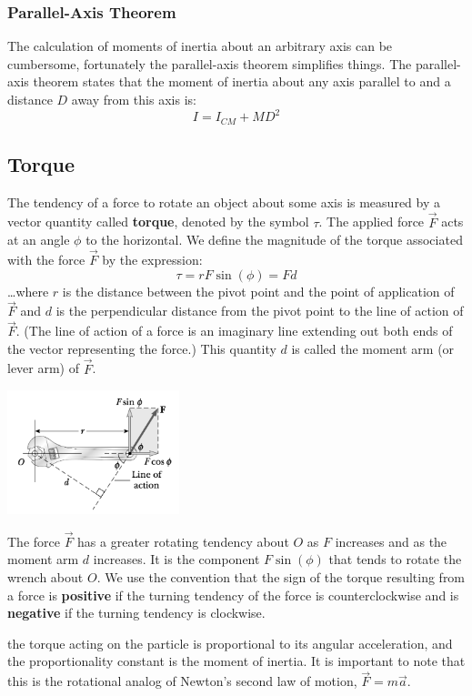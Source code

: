 \documentclass{article}
\begin{document}
\subsubsection{Parallel-Axis Theorem}
The calculation of moments of inertia about an arbitrary axis can be cumbersome, fortunately the parallel-axis theorem simplifies things. The parallel-axis theorem states that the moment of inertia about any axis parallel to and a distance $D$ away from this axis is:
\[
I=I_{CM}+MD^2
\]
\subsection{Torque}
The tendency of a force to rotate an object about some axis is measured by a vector quantity called \textbf{torque}, denoted by the symbol $\tau$. The applied force $\vec{F}$ acts at an angle $\phi$ to the horizontal. We define the magnitude of the torque associated with the force $\vec{F}$ by the expression:
\[
\tau=rF\sin(\phi)=Fd
\]
\ldots where $r$ is the distance between the pivot point and the point of application of $\vec{F}$ and $d$ is the perpendicular distance from the pivot point to the line of action of $\vec{F}$. (The line of action of a force is an imaginary line extending out both ends of the vector representing the force.) This quantity $d$ is called the moment arm (or lever arm) of $\vec{F}$.
\begin{multicols}{2}
  \centerline{\includegraphics[width=5cm]{wrench.png}}
  \columnbreak
  The force $\vec{F}$ has a greater rotating tendency about $O$ as $F$ increases and as the moment arm $d$ increases. It is the component $F\sin(\phi)$ that tends to rotate the wrench about $O$. We use the convention that the sign of the torque resulting from a force is \textbf{positive} if the turning tendency of the force is counterclockwise and is \textbf{negative} if the turning tendency is clockwise.
\end{multicols}
the torque acting on the particle is proportional to its angular acceleration, and the proportionality constant is the moment of inertia. It is important to note that this is the rotational analog of Newton’s second law of motion, $\vec{F}=m\vec{a}$.
\end{document}

